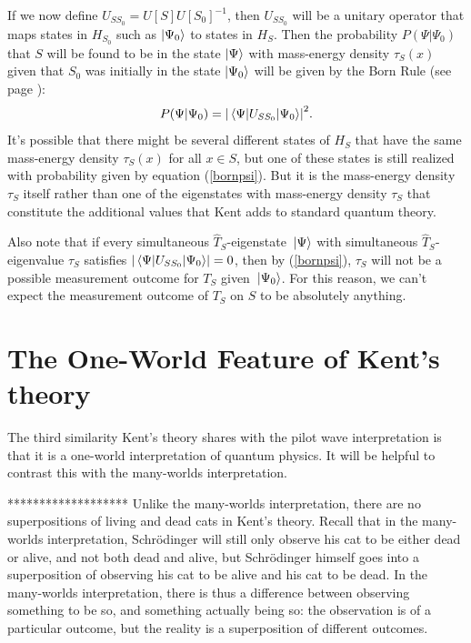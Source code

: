  If we now define $U_{SS_0}=U[S]U[S_0]^{-1}$,\label{SchwingerUnitaryOP} then $U_{SS_0}$ will be a unitary operator that maps states in $H_{S_0}$ such as $\ket{\Psi_0}$ to states in $H_S$. Then the probability $P(\Psi|\Psi_0)$ that  $S$ will be found to be in the state $\ket{\Psi}$ with mass-energy density $\tau_S(x)$ given that $S_0$ was initially in the state $\ket{\Psi_0}$ will be given by the Born Rule (see page \pageref{bornrule}):
 \begin{equation}\label{bornpsi}
 P(\Psi|\Psi_0) = \abs{\mel{\Psi}{U_{SS_0}}{\Psi_0}}^2.
 \end{equation}
It's possible that there might be several different states of $H_S$ that have the same mass-energy density $\tau_S(x)$ for all $x\in S$, but one of these states is still realized with probability given by equation (\ref{bornpsi}). But it is the mass-energy density $\tau_S$ itself rather than one of the eigenstates with mass-energy density $\tau_S$ that constitute the additional values that Kent adds to standard quantum theory. 

Also note that  if every simultaneous $\hat{T}_S$-eigenstate $\ket*{\Psi}$ with simultaneous $\hat{T}_S$-eigenvalue $\tau_S$ satisfies $\abs{\mel{\Psi}{U_{SS_0}}{\Psi_0}}=0$, then by (\ref{bornpsi}), $\tau_S$ will not be a possible measurement outcome for $T_S$ given $\ket*{\Psi_0}$. For this reason, we can't expect the measurement outcome of $T_S$ on $S$ to be absolutely anything.

\section{The One-World Feature of Kent's theory}
The third similarity Kent's theory shares with the pilot wave interpretation is that it is a one-world interpretation of quantum physics. It will be helpful to contrast this with the many-worlds interpretation. 

******************* Unlike the many-worlds interpretation, there are no superpositions of living and dead cats in Kent's theory. Recall that in the many-worlds interpretation, Schr\"{o}dinger will still only observe his cat to be either dead or alive, and not both dead and alive, but Schr\"{o}dinger himself goes into a superposition of observing his cat to be alive and his cat to be dead. In the many-worlds interpretation, there is thus a difference between observing something to be so, and something actually being so: the observation is of a particular outcome, but the reality is a superposition of different outcomes. 

